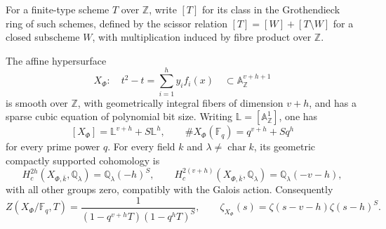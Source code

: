 For a finite-type scheme $T$ over $\mathbb Z$, write $[T]$ for its class in the Grothendieck ring of such schemes, defined by the scissor relation $[T]=[W]+[T\setminus W]$ for a closed subscheme $W$, with multiplication induced by fibre product over $\mathbb Z$.

\begin{theorem}\label{thm:cubic}
The affine hypersurface
\begin{equation}\label{eq:cubic}
 X_\Phi:\quad t^2-t=\sum_{i=1}^h y_i f_i(x)
 \quad\subset\mathbb A^{v+h+1}_{\mathbb Z}
\end{equation}
is smooth over $\mathbb Z$, with geometrically integral fibers of dimension $v+h$, and has a sparse cubic equation of polynomial bit size. Writing $\mathbb L=[\mathbb A^1_{\mathbb Z}]$, one has
\[
 [X_\Phi]=\mathbb L^{v+h}+S\mathbb L^h,
 \qquad
 \#X_\Phi(\mathbb F_q)=q^{v+h}+Sq^h
\]
for every prime power $q$. For every field $k$ and $\lambda\neq\operatorname{char}k$, its geometric compactly supported cohomology is
\[
 H_c^{2h}(X_{\Phi,\bar k},\mathbb Q_\lambda)
        =\mathbb Q_\lambda(-h)^S,
 \qquad
 H_c^{2(v+h)}(X_{\Phi,\bar k},\mathbb Q_\lambda)
        =\mathbb Q_\lambda(-v-h),
\]
with all other groups zero, compatibly with the Galois action. Consequently
\[
 Z(X_\Phi/\mathbb F_q,T)
      =\frac{1}{(1-q^{v+h}T)(1-q^hT)^S},
 \qquad
 \zeta_{X_\Phi}(s)=\zeta(s-v-h)\zeta(s-h)^S.
\]
\end{theorem}
